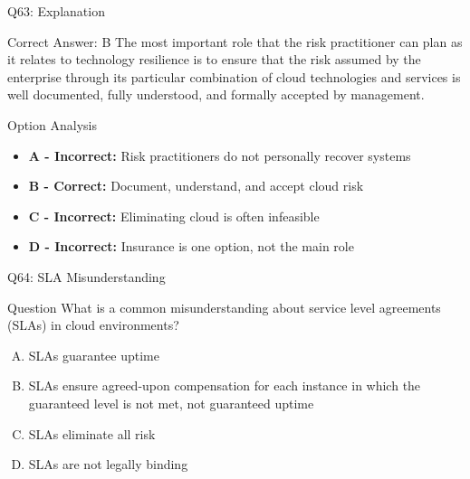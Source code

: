 \documentclass{beamer}
\begin{document}
	\begin{frame}{Q63: Explanation}
		\begin{block}{Correct Answer: B}
			The most important role that the risk practitioner can plan as it relates to technology resilience is to ensure that the risk assumed by the enterprise through its particular combination of cloud technologies and services is well documented, fully understood, and formally accepted by management.
		\end{block}
		\begin{block}{Option Analysis}
			\begin{itemize}
				\item \textbf{A - Incorrect:} Risk practitioners do not personally recover systems
				\item \textbf{B - Correct:} Document, understand, and accept cloud risk
				\item \textbf{C - Incorrect:} Eliminating cloud is often infeasible
				\item \textbf{D - Incorrect:} Insurance is one option, not the main role
			\end{itemize}
		\end{block}
	\end{frame}
	
	\begin{frame}{Q64: SLA Misunderstanding}
		\begin{block}{Question}
			What is a common misunderstanding about service level agreements (SLAs) in cloud environments?
		\end{block}
		\begin{enumerate}[(A)]
			\item SLAs guarantee uptime
			\item SLAs ensure agreed-upon compensation for each instance in which the guaranteed level is not met, not guaranteed uptime
			\item SLAs eliminate all risk
			\item SLAs are not legally binding
		\end{enumerate}
	\end{frame}
	
\end{document}
